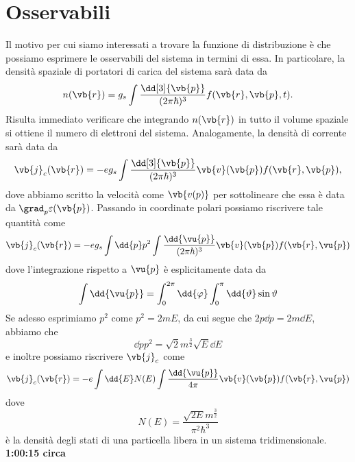 \section{Osservabili}
Il motivo per cui siamo interessati a trovare la funzione di distribuzione è che possiamo esprimere le osservabili del sistema in termini di essa. In particolare, la densità spaziale di portatori di carica del sistema sarà data da
\begin{equation*}
    n(\vb{r})
    =g_s \int \frac{\dd[3]{\vb{p}}}{(2 \pi \hbar)^3} f(\vb{r},\vb{p},t).
\end{equation*}
Risulta immediato verificare che integrando $n(\vb{r})$ in tutto il volume spaziale si ottiene il numero di elettroni del sistema. Analogamente, la densità di corrente sarà data da
\begin{equation*}
    \vb{j}_c(\vb{r})
    =-e g_s \int \frac{\dd[3]{\vb{p}}}{(2 \pi \hbar)^3} \vb{v}(\vb{p}) f(\vb{r},\vb{p}),
\end{equation*}
dove abbiamo scritto la velocità come $\vb{v(p)}$ per sottolineare che essa è data da $\grad_p \varepsilon(\vb{p})$.
Passando in coordinate polari possiamo riscrivere tale quantità come
\begin{equation*}
    \vb{j}_c(\vb{r})
    =-e g_s \int \dd{p} p^2 \int \frac{\dd{\vu{p}}}{(2\pi\hbar)^3} \vb{v}(\vb{p}) f(\vb{r},\vu{p})
\end{equation*}
dove l'integrazione rispetto a $\vu{p}$ è esplicitamente data da
\begin{equation*}
    \int \dd{\vu{p}}
    =\int_{0}^{2\pi} \dd{\varphi} \int_{0}^{\pi} \dd{\vartheta} \sin{\vartheta}
\end{equation*}
Se adesso esprimiamo $p^2$ come $p^2=2mE$, da cui segue che $2p \dd{p}=2m \dd{E}$, abbiamo che
\begin{equation*}
    \dd{p} p^2
    =\sqrt{2} m^{\frac{3}{2}} \sqrt{E} \dd{E}
\end{equation*}
e inoltre possiamo riscrivere $\vb{j}_c$ come
\begin{equation*}
    \vb{j}_c(\vb{r})
    =-e \int \dd{E} N(E) \int \frac{\dd{\vu{p}}}{4\pi} \vb{v}(\vb{p}) f(\vb{r},\vu{p})
\end{equation*}
dove
\begin{equation*}
    N(E)
    =\frac{\sqrt{2E} m^{\frac{3}{2}}}{\pi^2 \hbar^3}
\end{equation*}
è la densità degli stati di una particella libera in un sistema tridimensionale.\\
\textbf{1:00:15 circa}
